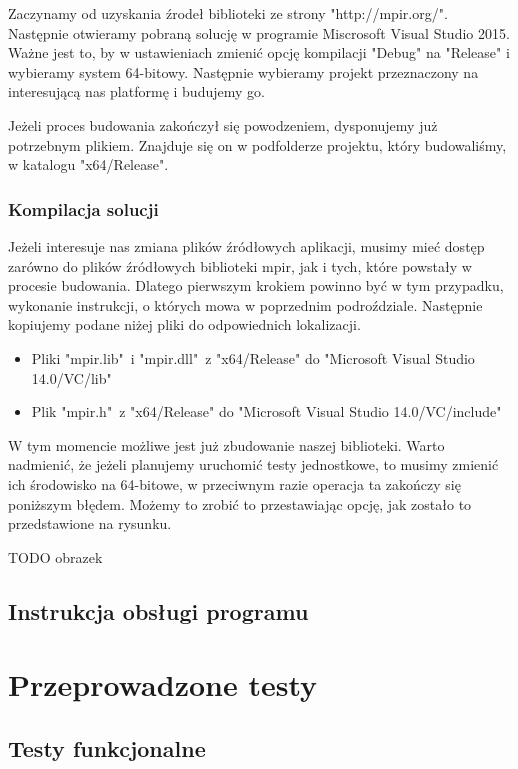 \documentclass[oneside,a4paper]{book}
\begin{document}
	Zaczynamy od uzyskania źrodeł biblioteki ze strony "http://mpir.org/". Następnie otwieramy pobraną solucję w programie Miscrosoft Visual Studio 2015. Ważne jest to, by w ustawieniach zmienić opcję kompilacji "Debug" na "Release" i wybieramy system 64-bitowy. Następnie wybieramy projekt przeznaczony na interesującą nas platformę i budujemy go.
	
	Jeżeli proces budowania zakończył się powodzeniem, dysponujemy już potrzebnym plikiem. Znajduje się on w podfolderze projektu, który budowaliśmy, w katalogu "x64/Release".
	
	\subsection{Kompilacja solucji}
	
	Jeżeli interesuje nas zmiana plików źródłowych aplikacji, musimy mieć dostęp zarówno do plików źródłowych biblioteki mpir, jak i tych, które powstały w procesie budowania. Dlatego pierwszym krokiem powinno być w tym przypadku, wykonanie instrukcji, o których mowa w poprzednim podroździale. Następnie kopiujemy podane niżej pliki do odpowiednich lokalizacji.
	
	\begin{itemize}
		\item Pliki "mpir.lib"\ i "mpir.dll"\ z "x64/Release" do "Microsoft Visual Studio 14.0/VC/lib"
		\item Plik "mpir.h"\ z "x64/Release" do "Microsoft Visual Studio 14.0/VC/include"
	\end{itemize}
	
	W tym momencie możliwe jest już zbudowanie naszej biblioteki. Warto nadmienić, że jeżeli planujemy uruchomić testy jednostkowe, to musimy zmienić ich środowisko na 64-bitowe, w przeciwnym razie operacja ta zakończy się poniższym błędem. Możemy to zrobić to przestawiając opcję, jak zostało to przedstawione na rysunku.
	
	TODO obrazek	
	
	\section{Instrukcja obsługi programu}
	
	\chapter{Przeprowadzone testy}
	
	\section{Testy funkcjonalne}
	
\end{document}
